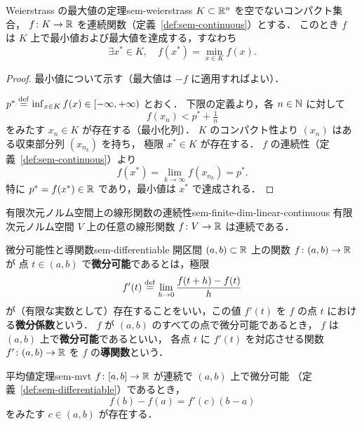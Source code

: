 \begin{theorem}{Weierstrass の最大値の定理}{sem-weierstrass}
  $K \subset \mathbb{R}^n$ を空でないコンパクト集合，
  $f \colon K \to \mathbb{R}$ を連続関数（定義~\ref{def:sem-continuous}）とする．
  このとき $f$ は $K$ 上で最小値および最大値を達成する，すなわち
  \[
    \exists x^* \in K,\quad f(x^*) = \min_{x \in K} f(x).
  \]
\end{theorem}

\begin{proof}
  最小値について示す（最大値は $-f$ に適用すればよい）．

  $p^* \overset{\mathrm{def}}{=} \inf_{x \in K} f(x) \in [-\infty, +\infty)$ とおく．
  下限の定義より，各 $n \in \mathbb{N}$ に対して
  \[
    f(x_n) < p^* + \tfrac{1}{n}
  \]
  をみたす $x_n \in K$ が存在する（最小化列）．
  $K$ のコンパクト性より $(x_n)$ はある収束部分列 $(x_{n_k})$ を持ち，
  極限 $x^* \in K$ が存在する．
  $f$ の連続性（定義~\ref{def:sem-continuous}）より
  \[
    f(x^*) = \lim_{k \to \infty} f(x_{n_k}) = p^*.
  \]
  特に $p^* = f(x^*) \in \mathbb{R}$ であり，最小値は $x^*$ で達成される．
\end{proof}

\begin{proposition}{有限次元ノルム空間上の線形関数の連続性}{sem-finite-dim-linear-continuous}
  有限次元ノルム空間 $V$ 上の任意の線形関数 $f \colon V \to \mathbb{R}$ は連続である．
\end{proposition}

\begin{definition}{微分可能性と導関数}{sem-differentiable}
  開区間 $(a, b) \subset \mathbb{R}$ 上の関数 $f \colon (a, b) \to \mathbb{R}$ が
  点 $t \in (a, b)$ で\textbf{微分可能}であるとは，極限
  \[
    f'(t) \overset{\mathrm{def}}{=} \lim_{h \to 0} \frac{f(t + h) - f(t)}{h}
  \]
  が（有限な実数として）存在することをいい，この値 $f'(t)$ を
  $f$ の点 $t$ における\textbf{微分係数}という．
  $f$ が $(a, b)$ のすべての点で微分可能であるとき，
  $f$ は $(a, b)$ 上で\textbf{微分可能}であるといい，
  各点 $t$ に $f'(t)$ を対応させる関数 $f' \colon (a, b) \to \mathbb{R}$ を
  $f$ の\textbf{導関数}という．
\end{definition}

\begin{theorem}{平均値定理}{sem-mvt}
  $f \colon [a, b] \to \mathbb{R}$ が連続で $(a, b)$ 上で微分可能
  （定義~\ref{def:sem-differentiable}）であるとき，
  \[
    f(b) - f(a) = f'(c)(b - a)
  \]
  をみたす $c \in (a, b)$ が存在する．
\end{theorem}

